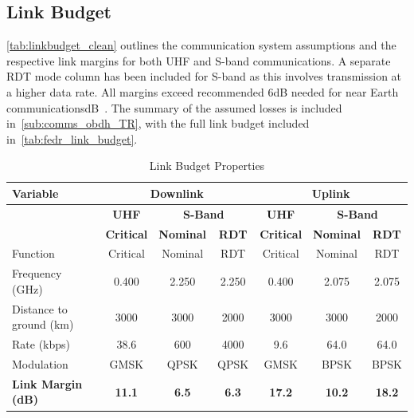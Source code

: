 \documentclass[a4paper, 11pt, conference]{IEEEtran}
\begin{document}
\subsection{Link Budget}
\autoref{tab:linkbudget_clean} outlines the communication system assumptions and the respective link margins for both UHF and S-band communications. A separate RDT mode column has been included for S-band as this involves transmission at a higher data rate. All margins exceed recommended 6dB needed for near Earth communicationsdB~\cite{wertz_space_1999}. The summary of the assumed losses is included in~\autoref{sub:comms_obdh_TR}, with the full link budget included in~\autoref{tab:fedr_link_budget}.


\begin{table}[!htbp]
    \centering
    \caption{Link Budget Properties}
    \label{tab:linkbudget_clean}
    \begin{tabular}{l c c c c c c}
        \toprule
        \textbf{Variable} & \multicolumn{3}{c}{\textbf{Downlink}} & \multicolumn{3}{c}{\textbf{Uplink}} \\
        \midrule
        & \textbf{UHF} & \multicolumn{2}{c}{\textbf{S-Band}} & \textbf{UHF} & \multicolumn{2}{c}{\textbf{S-Band}} \\
        \midrule
        & \textbf{Critical} & \textbf{Nominal} & \textbf{RDT} & \textbf{Critical} & \textbf{Nominal} & \textbf{RDT} \\
        \midrule
        Function & Critical & Nominal & RDT & Critical & Nominal & RDT \\
        Frequency (GHz) & 0.400 & 2.250 & 2.250 & 0.400 & 2.075 & 2.075 \\
        Distance to ground (km) & 3000 & 3000 & 2000 & 3000 & 3000 & 2000 \\
        Rate (kbps) & 38.6 & 600 & 4000 & 9.6 & 64.0 & 64.0 \\
        Modulation & GMSK & QPSK & QPSK & GMSK & BPSK & BPSK \\
        \midrule
        \textbf{Link Margin (dB)} & \textbf{11.1} & \textbf{6.5} & \textbf{6.3} & \textbf{17.2} & \textbf{10.2} & \textbf{18.2} \\
        \bottomrule
    \end{tabular}
\end{table}
\end{document}
